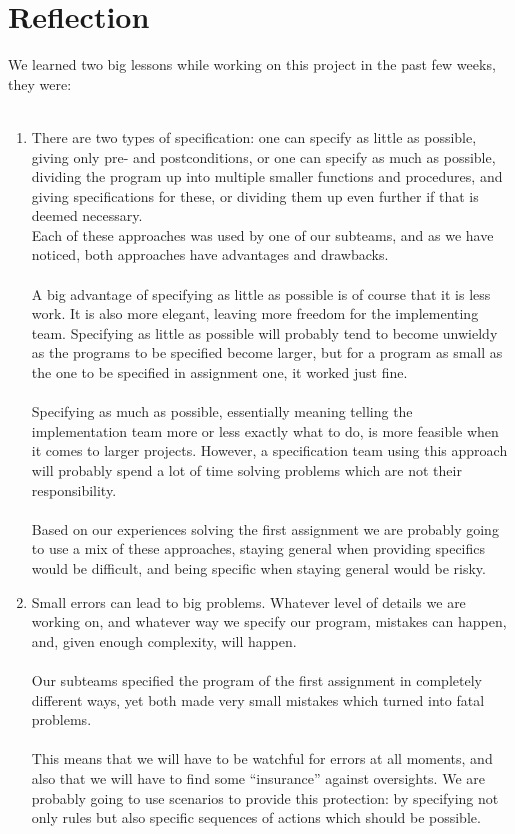 \documentclass[a4paper,twoside,11pt]{article}
\begin{document}
\section{Reflection} %
\label{sec:reflection}
We learned two big lessons while working on this project in the past few weeks, they were:\\
\\
\begin{enumerate}
\item There are two types of specification: one can specify as little as possible, giving only pre- and postconditions, or one can specify as much as possible, dividing the program up into multiple smaller functions and procedures, and giving specifications for these, or dividing them up even further if that is deemed necessary. 
\\
Each of these approaches was used by one of our subteams, and as we have noticed, both approaches have advantages and drawbacks.\\
\\
A big advantage of specifying as little as possible is of course that it is less work. It is also more elegant, leaving more freedom for the implementing team. Specifying as little as possible will probably tend to become unwieldy as the programs to be specified become larger, but for a program as small as the one to be specified in assignment one, it worked just fine.\\
\\
Specifying as much as possible, essentially meaning telling the implementation team more or less exactly what to do, is more feasible when it comes to larger projects. However, a specification team using this approach will probably spend a lot of time solving problems which are not their responsibility.\\
\\
Based on our experiences solving the first assignment we are probably going to use a mix of these approaches, staying general when providing specifics would be difficult, and being specific when staying general would be risky.\\
\item Small errors can lead to big problems. Whatever level of details we are working on, and whatever way we specify our program, mistakes can happen, and, given enough complexity, will happen.\\
\\
Our subteams specified the program of the first assignment in completely different ways, yet both made very small mistakes which turned into fatal problems.\\
\\
This means that we will have to be watchful for errors at all moments, and also that we will have to find some ``insurance'' against oversights. We are probably going to use scenarios to provide this protection: by specifying not only rules but also specific sequences of actions which should be possible.\\
\end{enumerate}	
\end{document}
